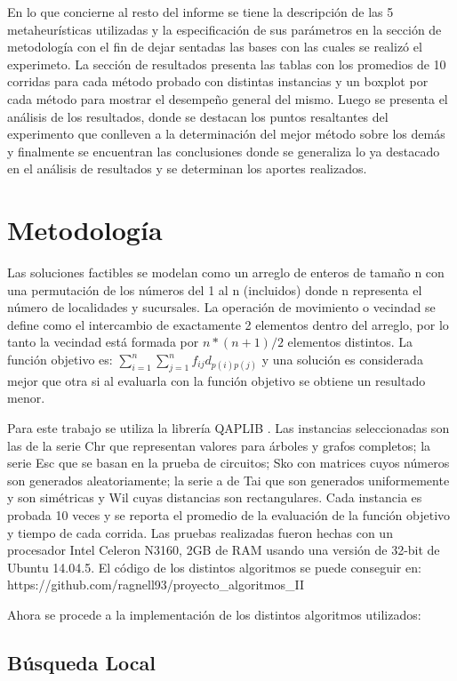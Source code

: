 \documentclass{ci5652}
\begin{document}
En lo que concierne al resto del informe se tiene la descripción de las 5 metaheurísticas utilizadas y la especificación de sus parámetros en la sección de metodología con el fin de dejar sentadas las bases con las cuales se realizó el experimeto. La sección de resultados presenta las tablas con los promedios de 10 corridas para cada método probado con distintas instancias y un boxplot por cada método para mostrar el desempeño general del mismo. Luego se presenta el análisis de los resultados, donde  se destacan los puntos resaltantes del experimento que conlleven a la determinación del mejor método sobre los demás y finalmente se encuentran las conclusiones donde se generaliza lo ya destacado en el análisis de resultados y se determinan los aportes realizados.

\section{Metodología}

Las soluciones factibles se modelan como un arreglo de enteros de tamaño n con una permutación de los números del 1 al n (incluidos) donde n representa el número de localidades y sucursales. La operación de movimiento o vecindad se define como el intercambio de exactamente 2 elementos dentro del arreglo, por lo tanto la vecindad está formada por $n*(n+1)/2$ elementos distintos. La función objetivo es: $\sum_{i=1}^{n} \sum_{j=1}^{n} f_{ij} d_{p(i)p(j)}$  y una solución es considerada mejor que otra si al evaluarla con la función objetivo se obtiene un resultado menor. 

Para este trabajo se utiliza la librería QAPLIB \cite{5}. Las instancias seleccionadas son las de la serie Chr que representan valores para árboles y grafos completos; la serie Esc que se basan en la prueba de circuitos; Sko con matrices cuyos números son generados aleatoriamente; la serie a de Tai que son generados uniformemente y son simétricas y Wil cuyas distancias son rectangulares.  Cada instancia es probada 10 veces y se reporta el promedio de la evaluación de la función objetivo y tiempo de cada corrida. Las pruebas realizadas fueron hechas con un procesador Intel Celeron N3160, 2GB de RAM usando una versión de 32-bit de Ubuntu 14.04.5. El código de los distintos algoritmos se puede conseguir en: https://github.com/ragnell93/proyecto\_algoritmos\_II

Ahora se procede a la implementación de los distintos algoritmos utilizados:

\subsection{Búsqueda Local}
\end{document}
